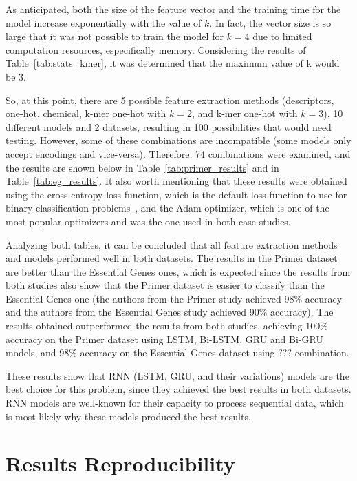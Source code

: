 As anticipated, both the size of the feature vector and the training time for the model increase exponentially with the value of $k$. In fact, the vector size is so large that it was not possible to train the model for $k=4$ due to limited computation resources, especifically memory. Considering the results of Table~\ref{tab:stats_kmer}, it was determined that the maximum value of k would be 3.

So, at this point, there are 5 possible feature extraction methods (descriptors, one-hot, chemical, k-mer one-hot with $k = 2$, and k-mer one-hot with $k = 3$), 10 different models and 2 datasets, resulting in 100 possibilities that would need testing. However, some of these combinations are incompatible (some models only accept encodings and vice-versa). Therefore, 74 combinations were examined, and the results are shown below in Table~\ref{tab:primer_results} and in Table~\ref{tab:eg_results}. It also worth mentioning that these results were obtained using the cross entropy loss function, which is the default loss function to use for binary classification problems~\cite{BrownleeHowNetworks}, and the Adam optimizer, which is one of the most popular optimizers and was the one used in both case studies.





Analyzing both tables, it can be concluded that all feature extraction methods and models performed well in both datasets. The results in the Primer dataset are better than the Essential Genes ones, which is expected since the results from both studies also show that the Primer dataset is easier to classify than the Essential Genes one (the authors from the Primer study achieved 98\% accuracy and the authors from the Essential Genes study achieved 90\% accuracy). The results obtained outperformed the results from both studies, achieving 100\% accuracy on the Primer dataset using \gls{LSTM}, Bi-LSTM, \gls{GRU} and Bi-GRU models, and 98\% accuracy on the Essential Genes dataset using ??? combination. 

These results show that \gls{RNN} (\gls{LSTM}, \gls{GRU}, and their variations) models are the best choice for this problem, since they achieved the best results in both datasets. \gls{RNN} models are well-known for their capacity to process sequential data, which is most likely why these models produced the best results.

\section{Results Reproducibility}

